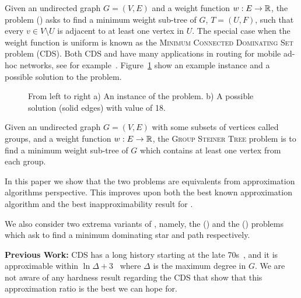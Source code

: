 % 

Given an undirected graph $G = (V, E)$ and a weight function $w:E \to \mathbb{R}$, 
the \Problem{} problem (\Prob{}) asks to find a minimum weight sub-tree of $G$, 
$T = (U, F)$, such that every $v \in V \setminus U$ is adjacent to at least one 
vertex in $U$.
The special case when the weight function is uniform is known as the 
\textsc{Minimum Connected Dominating Set} problem (CDS). 
Both CDS and \Prob{} have many applications in routing
for mobile ad-hoc networks, see for 
example~\cite{shin2010approximation,cheng2003polynomial,das1997routing,adasme2016models,adasme2017minimum}.
Figure~\ref{fig:problem} show an example instance and a possible solution to the problem. 

\begin{figure}
\begin{center}

\end{center}
\caption{\label{fig:problem}
From left to right
a) An instance of the \Problem{} problem.
b) A possible solution (solid edges) with value of 18.
}
\end{figure}

Given an undirected graph $G = (V, E)$ with some subsets of vertices called groups,
and a weight function $w:E \to \mathbb{R}$,
the \textsc{Group Steiner Tree} problem is to find a minimum weight sub-tree
of $G$ which contains at least one vertex from each group. 

In this paper we show that the two problems are equivalents 
from approximation algorithms perspective.
This improves upon both the best known approximation algorithm and the best 
inapproximability result for \Prob{}.

We also consider two extrema variants of \Prob{}, namely,
the \ProblemStar{} (\ProbStar{}) and the \ProblemPath{} (\ProbPath{}) 
problems which ask to find a minimum dominating star and path respectively.  

\textbf{Previous Work:}
CDS has a long history starting at the late 70s~\cite{sampathkumar1979connected},
and it is approximable within $\ln\Delta + 3$~\cite{guha1998approximation} 
where $\Delta$ is the maximum degree in $G$.
We are not aware of any hardness result regarding the CDS that show that this approximation
ratio is the best we can hope for.

